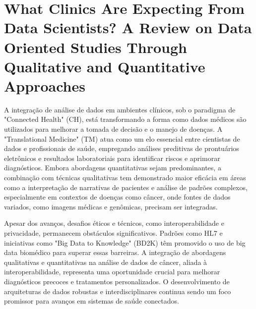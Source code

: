 \section{What Clinics Are Expecting From Data Scientists? A Review on Data Oriented Studies Through Qualitative and Quantitative Approaches}
A integração de análise de dados em ambientes clínicos, sob o paradigma de "Connected Health" (CH), está transformando a forma como dados 
médicos são utilizados para melhorar a tomada de decisão e o manejo de doenças. A "Translational Medicine" (TM) atua como um elo essencial 
entre cientistas de dados e profissionais de saúde, empregando análises preditivas de prontuários eletrônicos e resultados laboratoriais 
para identificar riscos e aprimorar diagnósticos. Embora abordagens quantitativas sejam predominantes, a combinação com técnicas qualitativas 
tem demonstrado maior eficácia em áreas como a interpretação de narrativas de pacientes e análise de padrões complexos, especialmente em 
contextos de doenças como câncer, onde fontes de dados variados, como imagens médicas e genômicas, precisam ser integradas. \cite{xu2019clinics}

Apesar dos avanços, desafios éticos e técnicos, como interoperabilidade e privacidade, permanecem obstáculos significativos. Padrões como HL7
 e iniciativas como "Big Data to Knowledge" (BD2K) têm promovido o uso de big data biomédico para superar essas barreiras. A integração de 
 abordagens qualitativas e quantitativas na análise de dados de câncer, aliada à interoperabilidade, representa uma oportunidade crucial para 
 melhorar diagnósticos precoces e tratamentos personalizados. O desenvolvimento de arquiteturas de dados robustas e interdisciplinares continua 
 sendo um foco promissor para avanços em sistemas de saúde conectados. \cite{xu2019clinics}